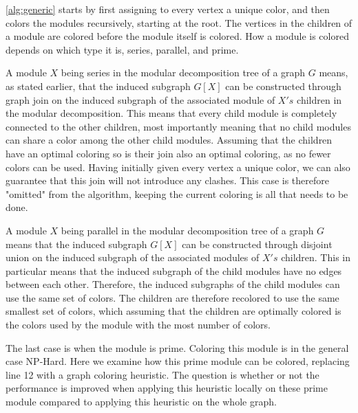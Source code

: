 \documentclass[a4paper]{article}
\begin{document}
\autoref{alg:generic} starts by first assigning to every vertex a unique color,
and then colors the modules recursively, starting at the root. The vertices in
the children of a module are colored before the module itself is colored. How a
module is colored depends on which type it is, series, parallel, and prime.

A module $X$ being series in the modular decomposition tree of a graph $G$
means, as stated earlier, that the induced subgraph $G[X]$ can be constructed
through graph join on the induced subgraph of the associated module of $X's$
children in the modular decomposition. This means that every child module is
completely connected to the other children, most importantly meaning that no
child modules can share a color among the other child modules. Assuming that
the children have an optimal coloring so is their join also an optimal
coloring, as no fewer colors can be used. Having initially given every vertex a
unique color, we can also guarantee that this join will not introduce any clashes.
This case is therefore "omitted" from the algorithm, keeping
the current coloring is all that needs to be done.

A module $X$ being parallel in the modular decomposition tree of a graph $G$ means that
the induced subgraph $G[X]$ can be constructed through disjoint union on the induced
subgraph of the associated modules of $X's$ children. This in particular means that 
the induced subgraph of the child modules have no edges between each other. Therefore,
the induced subgraphs of the child modules can use the same set of colors. The children
are therefore recolored to use the same smallest set of colors, 
which assuming that the children are optimally colored is the colors used by the module 
with the most number of colors.

The last case is when the module is prime. Coloring this module is in the
general case NP-Hard. Here we examine how this prime module can be colored,
replacing line 12 with a graph coloring heuristic. The question is whether or
not the performance is improved when applying this heuristic locally on these
prime module compared to applying this heuristic on the whole graph.
\end{document}
